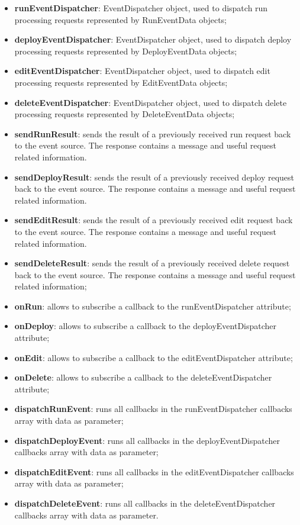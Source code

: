	\begin{itemize}
		\item \textbf{runEventDispatcher}: EventDispatcher object, used to dispatch run processing requests represented by RunEventData objects;
		\item \textbf{deployEventDispatcher}: EventDispatcher object, used to dispatch deploy processing requests represented by DeployEventData objects;
		\item \textbf{editEventDispatcher}: EventDispatcher object, used to dispatch edit processing requests represented by EditEventData objects;
		\item \textbf{deleteEventDispatcher}: EventDispatcher object, used to dispatch delete processing requests represented by DeleteEventData objects;
	\end{itemize}
	\begin{itemize}
		\item \textbf{sendRunResult}: sends the result of a previously received run request back to the event source. The response contains a message and useful request related information.
		\item \textbf{sendDeployResult}: sends the result of a previously received deploy request back to the event source. The response contains a message and useful request related information.
		\item \textbf{sendEditResult}: sends the result of a previously received edit request back to the event source. The response contains a message and useful request related information.
		\item \textbf{sendDeleteResult}: sends the result of a previously received delete request back to the event source. The response contains a message and useful request related information;
		\item \textbf{onRun}: allows to subscribe a callback to the runEventDispatcher attribute;
		\item \textbf{onDeploy}: allows to subscribe a callback to the deployEventDispatcher attribute;
		\item \textbf{onEdit}: allows to subscribe a callback to the editEventDispatcher attribute;
		\item \textbf{onDelete}: allows to subscribe a callback to the deleteEventDispatcher attribute;
		\item \textbf{dispatchRunEvent}: runs all callbacks in the runEventDispatcher callbacks array with data as parameter;
		\item \textbf{dispatchDeployEvent}: runs all callbacks in the deployEventDispatcher callbacks array with data as parameter;
		\item \textbf{dispatchEditEvent}: runs all callbacks in the editEventDispatcher callbacks array with data as parameter;
		\item \textbf{dispatchDeleteEvent}: runs all callbacks in the deleteEventDispatcher callbacks array with data as parameter.
	\end{itemize}
